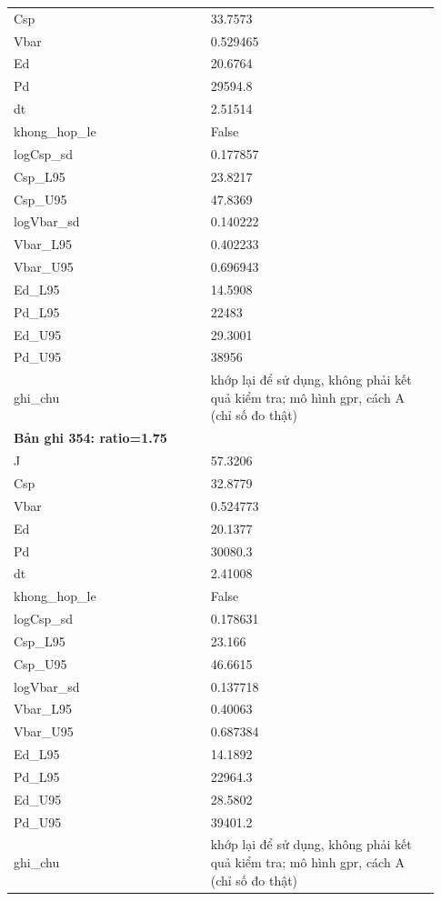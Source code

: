 \begin{longtable}{p{0.43\linewidth}p{0.50\linewidth}}
Csp & 33.7573 \\
Vbar & 0.529465 \\
Ed & 20.6764 \\
Pd & 29594.8 \\
dt & 2.51514 \\
khong\_\allowbreak hop\_\allowbreak le & False \\
logCsp\_\allowbreak sd & 0.177857 \\
Csp\_\allowbreak L95 & 23.8217 \\
Csp\_\allowbreak U95 & 47.8369 \\
logVbar\_\allowbreak sd & 0.140222 \\
Vbar\_\allowbreak L95 & 0.402233 \\
Vbar\_\allowbreak U95 & 0.696943 \\
Ed\_\allowbreak L95 & 14.5908 \\
Pd\_\allowbreak L95 & 22483 \\
Ed\_\allowbreak U95 & 29.3001 \\
Pd\_\allowbreak U95 & 38956 \\
ghi\_\allowbreak chu & khớp lại để sử dụng, không phải kết quả kiểm tra; mô hình gpr, cách A (chỉ số đo thật) \\
\midrule
\multicolumn{2}{p{0.95\linewidth}}{\textbf{Bản ghi 354: ratio=1.75}} \\
J & 57.3206 \\
Csp & 32.8779 \\
Vbar & 0.524773 \\
Ed & 20.1377 \\
Pd & 30080.3 \\
dt & 2.41008 \\
khong\_\allowbreak hop\_\allowbreak le & False \\
logCsp\_\allowbreak sd & 0.178631 \\
Csp\_\allowbreak L95 & 23.166 \\
Csp\_\allowbreak U95 & 46.6615 \\
logVbar\_\allowbreak sd & 0.137718 \\
Vbar\_\allowbreak L95 & 0.40063 \\
Vbar\_\allowbreak U95 & 0.687384 \\
Ed\_\allowbreak L95 & 14.1892 \\
Pd\_\allowbreak L95 & 22964.3 \\
Ed\_\allowbreak U95 & 28.5802 \\
Pd\_\allowbreak U95 & 39401.2 \\
ghi\_\allowbreak chu & khớp lại để sử dụng, không phải kết quả kiểm tra; mô hình gpr, cách A (chỉ số đo thật) \\

\end{longtable}

